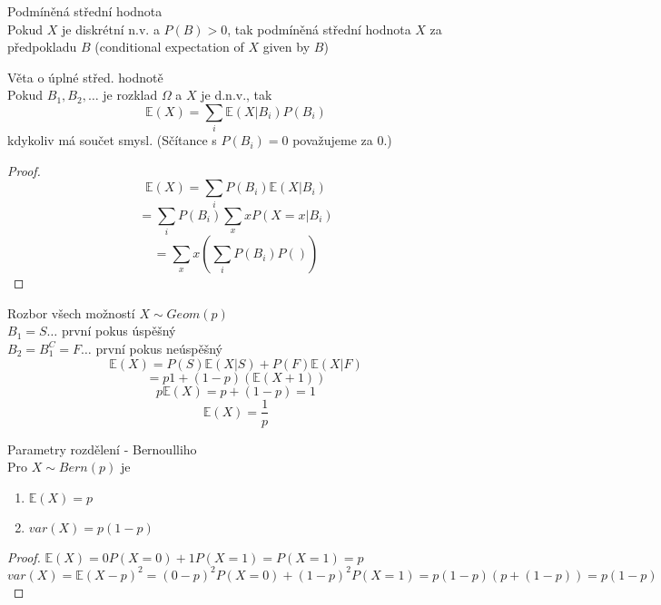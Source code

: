 \documentclass[../main.tex]{subfiles}
\begin{document}
\begin{definition}
    Podmíněná střední hodnota\\

    Pokud $X$ je diskrétní n.v. a $P(B) > 0$, tak podmíněná střední hodnota 
    $X$ za předpokladu $B$ (conditional expectation of $X$ given by $B$)
\end{definition}
\begin{theorem}
    Věta o úplné střed. hodnotě\\

    Pokud $B_1,B_2,\dots$ je rozklad $\Omega$ a $X$ je d.n.v., tak
    \[\mathbb{E}(X) = \sum_i \mathbb{E}(X | B_i) P(B_i)\]
    kdykoliv má součet smysl. (Sčítance s $P(B_i) = 0$ považujeme za 0.)
    \begin{proof}
        \[\mathbb{E}(X) = \sum_i P(B_i)\mathbb{E}(X | B_i)\]
        \[= \sum_i P(B_i) \sum_x xP(X=x | B_i)\]
        \[= \sum_x x (\sum_i P(B_i)P())\]
    \end{proof}

    Rozbor všech možností
    $X \sim Geom(p)$\\
    $B_1 = S \dots$ první pokus úspěšný\\
    $B_2 = B^C_1 = F \dots$ první pokus neúspěšný\\
    \[\mathbb{E}(X) = P(S)\mathbb{E}(X|S) + P(F)\mathbb{E}(X|F)\]
    \[= p1 + (1-p)(\mathbb{E}(X+1))\]
    \[p\mathbb{E}(X) = p + (1-p) = 1\]
    \[\mathbb{E}(X) = \frac{1}{p}\]
\end{theorem}
\begin{theorem}
    Parametry rozdělení - Bernoulliho\\

    Pro $X\sim Bern(p)$ je 
    \begin{enumerate}
        \item $\mathbb{E}(X) = p$
        \item $var(X) = p(1-p)$
    \end{enumerate}
    \begin{proof}
        $\mathbb{E}(X) = 0P(X=0)+1P(X=1) = P(X=1) = p$\\
        $var(X) = \mathbb{E}(X-p)^2 = (0-p)^2P(X=0) + (1-p)^2P(X=1) = p(1-p)(p+(1-p)) = p(1-p)$
    \end{proof}
\end{theorem}
\end{document}
